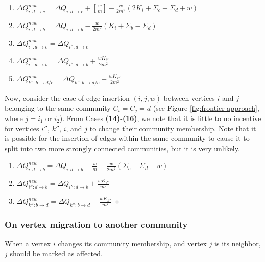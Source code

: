 \begin{enumerate}[start=9]
  \item $\Delta Q_{i:d \rightarrow c}^{new} = \Delta Q_{i:d \rightarrow c} + [\frac{w}{m}] - \frac{w}{2m^2} (2K_i + \Sigma_c - \Sigma_d + w)$
  \item $\Delta Q_{i:d \rightarrow b}^{new} = \Delta Q_{i:d \rightarrow b} - \frac{w}{2m^2} (K_i + \Sigma_b - \Sigma_d)$
  \item $\Delta Q_{i'':d \rightarrow c}^{new} = \Delta Q_{i'':d \rightarrow c}$
  \item $\Delta Q_{i'':d \rightarrow b}^{new} = \Delta Q_{i'':d \rightarrow b} + \frac{wK_{i''}}{2m^2}$
  \item $\Delta Q_{k'':b \rightarrow d/c}^{new} = \Delta Q_{k'':b \rightarrow d/c} - \frac{wK_{k''}}{2m^2}$
\end{enumerate}

Now, consider the case of edge insertion $(i, j, w)$ between vertices $i$ and $j$ belonging to the same community $C_i = C_j = d$ (see Figure \ref{fig:frontier-approach}, where $j = i_1$ or $i_2$). From Cases \textbf{(14)}-\textbf{(16)}, we note that it is little to no incentive for vertices $i''$, $k''$, $i$, and $j$ to change their community membership. Note that it is possible for the insertion of edges within the same community to cause it to split into two more strongly connected communities, but it is very unlikely.

\begin{enumerate}[start=14]
  \item $\Delta Q_{i:d \rightarrow b}^{new} = \Delta Q_{i:d \rightarrow b} - \frac{w}{m} - \frac{w}{2m^2} (\Sigma_c - \Sigma_d - w)$
  \item $\Delta Q_{i'':d \rightarrow b}^{new} = \Delta Q_{i'':d \rightarrow b} + \frac{wK_{i''}}{m^2}$
  \item $\Delta Q_{k'':b \rightarrow d}^{new} = \Delta Q_{k'':b \rightarrow d} - \frac{wK_{k''}}{m^2}$ \hfill $\diamond$
\end{enumerate}




\subsubsection{On vertex migration to another community}

\begin{lemma}
\label{thm:louvain--remark}
When a vertex $i$ changes its community membership, and vertex $j$ is its neighbor, $j$ should be marked as affected.
\end{lemma}

